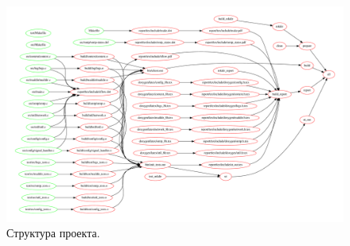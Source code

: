 \documentclass[a4paper,12pt]{report}
\begin{document}
	\begin{figure}[H]
	\centering
	\includegraphics[width=\textwidth]{./include/make.pdf}
	\caption{Структура проекта.}
	\label{fig:make_server}
	\end{figure}
\end{document}
